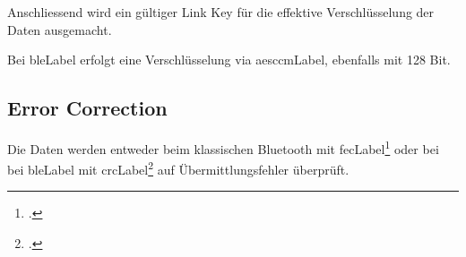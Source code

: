 Anschliessend wird ein gültiger Link Key für die effektive Verschlüsselung der Daten ausgemacht.

Bei \gls{bleLabel} erfolgt eine Verschlüsselung via \gls{aesccmLabel}, ebenfalls mit 128 Bit.

\subsection{Error Correction}
Die Daten werden entweder beim klassischen Bluetooth mit \gls{fecLabel}\footcite{Forward_error_correction_Wikipedia_2015-04-27} oder bei bei \gls{bleLabel} mit \gls{crcLabel}\footcite{Cyclic_redundancy_check_Wikipedia_2015-04-27} auf Übermittlungsfehler überprüft.
